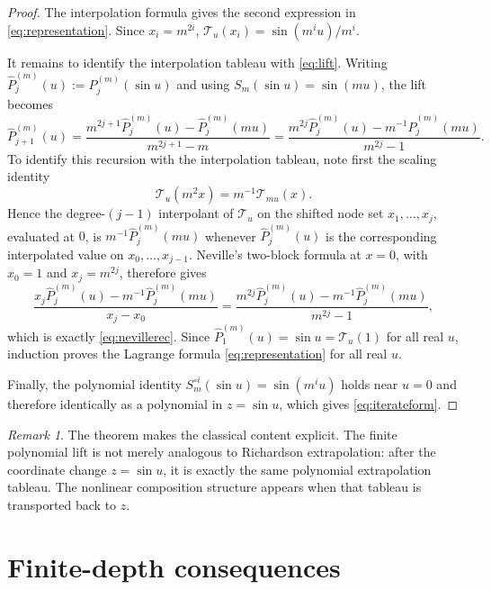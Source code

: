 \documentclass[11pt]{article}
\theoremstyle{remark}
\newtheorem{remark}[theorem]{Remark}
\begin{document}
\begin{proof}
The interpolation formula gives the second expression in
\eqref{eq:representation}.  Since $x_i=m^{2i}$,
$\mathcal T_u(x_i)=\sin(m^iu)/m^i$.

It remains to identify the interpolation tableau with \eqref{eq:lift}.
Writing
$\widehat P^{(m)}_j(u):=P^{(m)}_j(\sin u)$ and using
$S_m(\sin u)=\sin(mu)$, the lift becomes
\begin{equation}
\widehat P^{(m)}_{j+1}(u)
=
\frac{m^{2j+1}\widehat P^{(m)}_j(u)
      -\widehat P^{(m)}_j(mu)}{m^{2j+1}-m}
=
\frac{m^{2j}\widehat P^{(m)}_j(u)
      -m^{-1}\widehat P^{(m)}_j(mu)}{m^{2j}-1}.
\label{eq:nevillerec}
\end{equation}
To identify this recursion with the interpolation tableau, note first the
scaling identity
\begin{equation}
\mathcal T_u(m^2x)=m^{-1}\mathcal T_{mu}(x).
\label{eq:scalingTu}
\end{equation}
Hence the degree-$(j-1)$ interpolant of $\mathcal T_u$ on the shifted node
set $x_1,\ldots,x_j$, evaluated at $0$, is
$m^{-1}\widehat P^{(m)}_j(mu)$ whenever
$\widehat P^{(m)}_j(u)$ is the corresponding interpolated value on
$x_0,\ldots,x_{j-1}$.  Neville's two-block formula at $x=0$, with
$x_0=1$ and $x_j=m^{2j}$, therefore gives
\[
\frac{x_j\widehat P^{(m)}_j(u)
      -m^{-1}\widehat P^{(m)}_j(mu)}
     {x_j-x_0}
=
\frac{m^{2j}\widehat P^{(m)}_j(u)
      -m^{-1}\widehat P^{(m)}_j(mu)}
     {m^{2j}-1},
\]
which is exactly \eqref{eq:nevillerec}.  Since
$\widehat P^{(m)}_1(u)=\sin u=\mathcal T_u(1)$ for all real $u$, induction
proves the Lagrange formula \eqref{eq:representation} for all real $u$.

Finally, the polynomial identity
$S_m^{\circ i}(\sin u)=\sin(m^iu)$ holds near $u=0$ and therefore identically
as a polynomial in $z=\sin u$, which gives \eqref{eq:iterateform}.
\end{proof}

\begin{remark}
The theorem makes the classical content explicit.  The finite polynomial lift
is not merely analogous to Richardson extrapolation: after the coordinate
change $z=\sin u$, it is exactly the same polynomial extrapolation tableau.
The nonlinear composition structure appears when that tableau is transported
back to $z$.
\end{remark}

\section{Finite-depth consequences}
\label{sec:finite}
\end{document}
